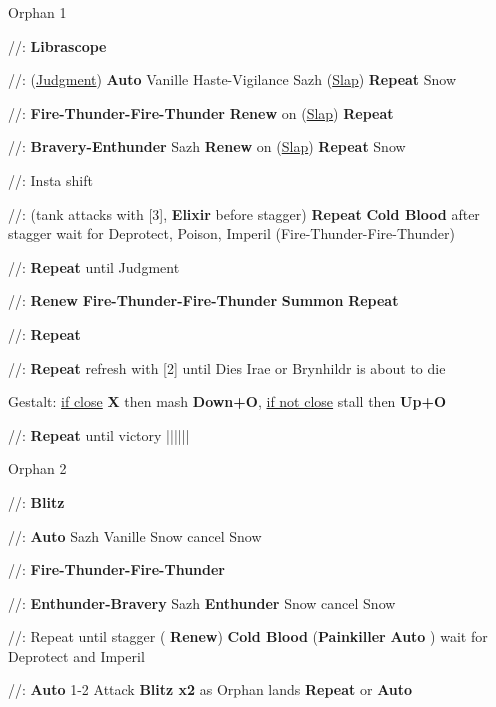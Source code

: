 \begin{fight}{Orphan 1}
	\item [2] \com/\com/\rav: \textbf{Librascope}
	\item [3] \syn/\sen/\med: (\underline{Judgment}) \to \textbf{Auto} Vanille \to Haste-Vigilance Sazh \to (\underline{Slap}) \to \textbf{Repeat} Snow
	\item [6] \rav/\rav/\rav: \textbf{Fire-Thunder-Fire-Thunder} \to \textbf{Renew} on (\underline{Slap}) \to \textbf{Repeat}
	\item [4] \syn/\rav/\rav: \textbf{Bravery-Enthunder} Sazh \to \textbf{Renew} on (\underline{Slap}) \to \textbf{Repeat} Snow
	\item [3] \syn/\sen/\med: Insta shift
	\item [5] \rav/\rav/\sab: (tank attacks with [3], \textbf{Elixir} before stagger) \textbf{Repeat} \to \textbf{Cold Blood} after stagger \to wait for Deprotect, Poison, Imperil (Fire-Thunder-Fire-Thunder)
	\item [1] \com/\com/\med: \textbf{Repeat} until Judgment
	\item [6] \rav/\rav/\rav: \textbf{Renew} \to \textbf{Fire-Thunder-Fire-Thunder} \to \textbf{Summon} \to \textbf{Repeat}
	\item [5] \rav/\rav/\sab: \textbf{Repeat}
	\item [1] \com/\com/\med: \textbf{Repeat} \to refresh with [2] until Dies Irae or Brynhildr is about to die
	\item Gestalt: \underline{if close} \textbf{X} then mash \textbf{Down+O}, \underline{if not close} stall then \textbf{Up+O}
	\item [1] \com/\com/\med: \textbf{Repeat} until victory |\skip|\skip|\skip|\skip|\skip|\skip
\end{fight}
\begin{fight}{Orphan 2}
	\item [2] \com/\com/\rav: \textbf{Blitz}
	\item [4] \syn/\rav/\rav: \textbf{Auto} Sazh \to Vanille \to Snow \to cancel Snow
	\item [6] \rav/\rav/\rav: \textbf{Fire-Thunder-Fire-Thunder}
	\item [4] \syn/\rav/\rav: \textbf{Enthunder-Bravery} Sazh \to \textbf{Enthunder} Snow \to cancel Snow
	\item [5] \rav/\rav/\sab: Repeat until stagger ( \to \textbf{Renew}) \to \textbf{Cold Blood} \to (\textbf{Painkiller} \to \textbf{Auto} \to ) wait for Deprotect and Imperil
	\item [1] \com/\com/\med: \textbf{Auto} 1-2 Attack \to \textbf{Blitz x2} as Orphan lands \to \textbf{Repeat} or \textbf{Auto}
\end{fight}
